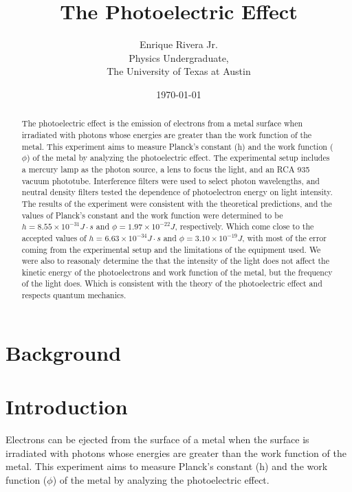 \documentclass[12pt]{article}
\title{The Photoelectric Effect}
\author{Enrique Rivera Jr. \\
                Physics Undergraduate, \\ 
                The University of Texas at Austin}
\date{\today}
\begin{document}
\maketitle

\begin{abstract}
        The photoelectric effect is the emission of electrons from a metal surface when irradiated with photons 
        whose energies are greater than the work function of the metal. This experiment aims to measure Planck's 
        constant (h) and the work function ($\phi$) of the metal by analyzing the photoelectric effect. The 
        experimental setup includes a mercury lamp as the photon source, a lens to focus the light, and an 
        RCA 935 vacuum phototube. Interference filters were used to select photon wavelengths, and neutral 
        density filters tested the dependence of photoelectron energy on light intensity. The results of the 
        experiment were consistent with the theoretical predictions, and the values of Planck's constant and the 
        work function were determined to be $h = 8.55 \times 10^{-31} J \cdot s$ and $\phi = 1.97 \times 10^{-22} J$,
        respectively. Which come close to the accepted values of $h = 6.63 \times 10^{-34} J \cdot s$ and 
        $\phi = 3.10 \times 10^{-19} J$, with most of the error coming from the experimental setup and the
        limitations of the equipment used. We were also to reasonaly determine the that the intensity of the light
        does not affect the kinetic energy of the photoelectrons and work function of the metal, but the frequency of the light does. Which is 
        consistent with the theory of the photoelectric effect and respects quantum mechanics.

\end{abstract}

\section{Background}

\section{Introduction}
        Electrons can be ejected from the surface of a metal when the surface is irradiated with photons 
        whose energies are greater than the work function of the metal. This experiment aims to measure 
        Planck's constant (h) and the work function ($\phi$) of the metal by analyzing the photoelectric effect.
\end{document}
